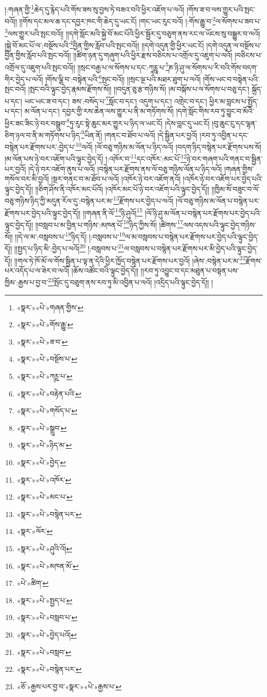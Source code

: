 །:གཞན་གྱི་\footnote{«སྣར་»«པེ་»གཞན་གྱིས་}ཆེད་དུ་རྙེད་པའི་གོས་ཟས་སུ་བྱས་ཏེ་བཟའ་བའི་ཕྱིར་འཇོག་པ་ལའོ། །གོས་ཟ་བ་ལས་གྱུར་པའི་སྤང་བའོ།། །།གོས་དང་མལ་ཆ་དང་དབྱར་ཁང་གི་ཆེད་དུ་ཡང་ངོ། །གང་ཡང་རུང་བའོ། །:གོས་རྒྱུ་བ་\footnote{«སྣར་»«པེ་»གོས་རྒྱུ་}ལ་སོགས་པ་ཟབ་པ་\footnote{«སྣར་»«པེ་»ཟ་བ་}ལས་གྱུར་པའི་སྤང་བའོ།། །།དགེ་སློང་མའི་སྐྱེ་བོ་མང་པོའི་ཕྱིར་སྦྱོར་དུ་བཅུག་ནས་རང་ལ་ཡོངས་སུ་བསྒྱུར་བ་ལའོ། །སྐྱེ་བོ་མང་པོ་ལ་:བསྔོས་པའི་\footnote{«སྣར་»«པེ་»བསྔོས་པ་}བྱིན་གྱིས་རློབ་པའི་སྤང་བའོ།། །།དགེ་འདུན་གྱི་ཕྱིར་ཡང་ངོ། །དགེ་འདུན་ལ་བསྔོས་པ་བྱིན་གྱིས་རློབ་པའི་སྤང་བའོ།། །།ཚིག་ཉན་དུ་གཞུག་པའི་ཕྱིར་རྫས་བཅིངས་པ་འགྲོལ་དུ་འཇུག་པ་ལའོ། །བཅིངས་པ་འགྲོལ་དུ་འཇུག་པའི་སྤང་བའོ།། །།སྲང་བརྒྱ་པ་ལ་སོགས་པ་དང་:ཀཱཪྵཱ་པ་\footnote{«སྣར་»«པེ་»ཀཪྵ་པ་}ཎ་ཉི་ཤུ་ལ་སོགས་པ་རི་བའི་གོས་བདག་གིར་བྱེད་པ་ལའོ། །གོས་ལྕི་བ་:བསྟེན་པའི་\footnote{«སྣར་»«པེ་»བརྟེན་པའི་}སྤང་བའོ།། །།སྲང་ལྔ་པའི་མཐར་ཐུག་པ་ལའོ། །གོས་ཡང་བ་བསྟེན་པའི་སྤང་བའོ། །སྤང་བའི་ལྟུང་བྱེད་རྣམས་རྫོགས་སོ།། །།བདུན་ཅུ་རྩ་གཉིས་སོ། །མ་བསྐོས་པ་ལ་སོགས་པ་བཅུ་དང་། སྐྲོད་པ་དང་། ཡང་ཡང་ཟ་བ་དང་། ཟས་:བསོད་པ་\footnote{«སྣར་»«པེ་»གསོད་པ་}སློང་བ་དང་། འདུག་པ་དང་། འགྲེང་བ་དང་། ཕྱིར་མ་བླངས་པ་སྤྱོད་པ་དང་། མ་ལོན་པ་དང་། དབྱར་གྱི་རས་ཆེན་ལས་གྱུར་པ་ནི་མ་གཏོགས་སོ། །དགེ་སློང་གིས་རབ་ཏུ་བྱུང་བ་མོའི་ཕྱིར་ཟང་ཟིང་ཉེ་བར་བསྒྲུབ་\footnote{«སྣར་»«པེ་»སྒྲུབ་}ཏུ་རུང་སྟེ་ཆུང་མར་གྱུར་པ་ཉིད་ལ་ཡང་ངོ། །དེས་བླང་དུ་ཡང་ངོ། །བུ་ཆུང་ངུ་དང་ལྷན་ཅིག་ཉལ་བ་ནི་མ་གཏོགས་པ་ཉིད་\footnote{«སྣར་»«པེ་»ཉིད་མ་}ཡིན་ནོ། །གནང་བ་ཐོབ་པ་ལའོ། །དེ་སྦྱིན་པར་བྱའོ། །རབ་ཏུ་འབྱིན་པ་དང་བསྙེན་པར་རྫོགས་པར་:བྱེད་པ་\footnote{«སྣར་»«པེ་»བྱེད་}ལའོ། །ལོ་བཅུ་གཉིས་མ་ལོན་པ་ཉིད་ལའོ། །བདག་ཉིད་བསྙེན་པར་རྫོགས་པས་སོ། །མ་ལོན་པས་ཉེ་བར་འཇོག་པའི་ལྟུང་བྱེད་དོ། །:འཁོར་བ་\footnote{«སྣར་»«པེ་»འཁོར་}དང་འཁོར་:མང་པོ་\footnote{«སྣར་»«པེ་»མང་པ་}ཉེ་བར་གཞག་པའི་གནང་བ་སྦྱིན་པར་བྱའོ། །དེ་ཉེ་བར་འཇོག་ནུས་པ་ལའོ། །བསྙེན་པར་རྫོགས་ནས་ལོ་བཅུ་གཉིས་ལོན་པ་ཉིད་ལའོ། །གཞན་གྱིས་གསོལ་བར་མི་བྱའོ། །སྔར་གནང་བ་མ་ཐོབ་པ་ལའོ། །འཁོར་ཉེ་བར་འཇོག་ནའོ། །འཁོར་ཉེ་བར་འཇོག་པར་བྱེད་པའི་ལྟུང་བྱེད་དོ།། །།ཅིག་ཤོས་ནི་འཁོར་མང་པོའོ། །འཁོར་མང་པོ་ཉེ་བར་འཇོག་པའི་ལྟུང་བྱེད་དོ།། །།ཁྱིམ་སོ་བཟུང་བ་ལོ་བཅུ་གཉིས་ཉིད་ཀྱི་མདུན་རོལ་དུ་:བསྙེན་པར་མ་\footnote{«སྣར་»«པེ་»བསྙེན་པར་}རྫོགས་པར་བྱེད་པ་ལའོ། །ལོ་བཅུ་གཉིས་མ་ལོན་པ་བསྙེན་པར་རྫོགས་པར་བྱེད་པའི་ལྟུང་བྱེད་དོ།། །།གཞན་ནི་ལོ་\footnote{«སྣར་»ལོར་}ཉི་ཤུའོ།\footnote{«སྣར་»«པེ་»ཤུའི་འོ།} །ལོ་ཉི་ཤུ་མ་ལོན་པ་བསྙེན་པར་རྫོགས་པར་བྱེད་པའི་ལྟུང་བྱེད་དོ།། །།བསླབ་པ་མ་བྱིན་པ་གཉིས་:མཁན་པོ་\footnote{«སྣར་»«པེ་»མཁན་མོ་}ཉིད་ཀྱིས་སོ། །ཚིགས་\footnote{«པེ་»ཚིག་}ལས་འདས་པའི་ལྟུང་བྱེད་གཉིས་སོ།། །།དེ་ལ་མ་:བསླབས་པ་\footnote{«སྣར་»«པེ་»སྤྱད་པ་}ཉིད་དོ། །:བསླབས་པ་\footnote{«སྣར་»«པེ་»བསླབ་པ་}ལ་མ་བསླབས་པ་བསྙེན་པར་རྫོགས་པར་བྱེད་པའི་ལྟུང་བྱེད་དོ།། །།སྤྱད་པ་ཉིད་མི་:བྱེད་པ་ལའོ།\footnote{«སྣར་»«པེ་»བྱེད་པའོ།} །:བསླབས་པ་\footnote{«སྣར་»«པེ་»བསླབ་}ལ་བསླབས་པ་བསྙེན་པར་རྫོགས་པར་མི་བྱེད་པའི་ལྟུང་བྱེད་དོ།། །།གལ་ཏེ་ཁོ་མོ་ལ་གོས་སྦྱིན་པ་ལྟ་ན་དེའི་ཕྱིར་ཁྱོད་བསྙེན་པར་རྫོགས་པར་བྱའོ། །ཞེས་:བསྙེན་པར་མ་\footnote{«སྣར་»«པེ་»བསྙེན་པར་}རྫོགས་པར་འདོད་པ་ལ་ཟེར་བ་ལའོ། །ཆོས་འཚོང་བའི་ལྟུང་བྱེད་དོ།། །།རབ་ཏུ་འབྱུང་བ་དང་མཐུན་པ་བསྟན་པས་ཁྱིམ་:རྒྱས་པ་བྱ་བ་\footnote{«ཅོ་»རྒྱས་པར་བྱ་བ་«སྣར་»«པེ་»རྒྱས་པ་}སྤོང་དུ་བཅུག་ནས་རབ་ཏུ་མི་འབྱིན་པ་ལའོ། །འདྲིད་པའི་ལྟུང་བྱེད་དོ།། །
